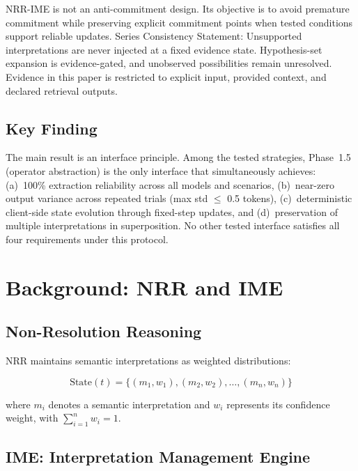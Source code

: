 \documentclass[11pt,a4paper]{article}
\begin{document}
NRR-IME is not an anti-commitment design. Its objective is to avoid premature commitment while preserving explicit commitment points when tested conditions support reliable updates.
Series Consistency Statement: Unsupported interpretations are never injected at a fixed evidence state. Hypothesis-set expansion is evidence-gated, and unobserved possibilities remain unresolved. Evidence in this paper is restricted to explicit input, provided context, and declared retrieval outputs.

\subsection{Key Finding}

The main result is an interface principle. Among the tested strategies,
Phase~1.5 (operator abstraction) is the only interface that simultaneously
achieves: (a)~100\% extraction reliability across all models and scenarios,
(b)~near-zero output variance across repeated trials (max std $\leq$ 0.5
tokens), (c)~deterministic client-side state evolution through fixed-step
updates, and (d)~preservation of multiple interpretations in superposition.
No other tested interface satisfies all four requirements under this protocol.

\section{Background: NRR and IME}
\label{sec:background}

\subsection{Non-Resolution Reasoning}

NRR maintains semantic interpretations as weighted distributions:

\begin{equation}
\text{State}(t) = \{(m_1, w_1), (m_2, w_2), \ldots, (m_n, w_n)\}
\end{equation}

where $m_i$ denotes a semantic interpretation and $w_i$ represents its confidence
weight, with $\sum_{i=1}^{n} w_i = 1$.

\subsection{IME: Interpretation Management Engine}
\end{document}
